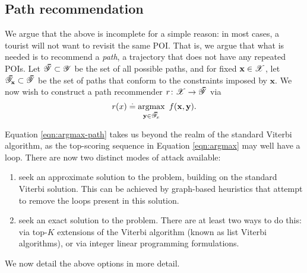 %
\subsection{Path recommendation}

We argue that the above is incomplete for a simple reason:
in most cases, a tourist will not want to revisit the same POI.
That is, we argue that what is needed is to recommend a \emph{path}, \ie a trajectory that does not have any repeated POIs.
Let $\thickbar{\YCal} \subset \YCal$ be the set of all possible paths,
and for fixed $\mathbf{x} \in \mathscr{X}$, let $\thickbar{\YCal}_{\x} \subset \thickbar{\YCal}$ be the set of paths that conform to the constraints imposed by $\mathbf{x}$.
We now wish to construct a path recommender $r \colon \XCal \to \thickbar{\YCal}$ via
\begin{equation}
	\label{eqn:argmax-path}
	r( x ) \defEq \argmax_{\mathbf{y} \in \thickbar{\YCal}_x}~f(\mathbf{x}, \mathbf{y}).
\end{equation}

Equation \ref{eqn:argmax-path} takes us beyond the realm of the standard Viterbi algorithm, as the top-scoring sequence in Equation \ref{eqn:argmax} may well have a loop.
There are now two distinct modes of attack available:
\begin{enumerate}
	\item seek an approximate solution to the problem, building on the standard Viterbi solution.
	This can be achieved by graph-based heuristics that attempt to remove the loops present in this solution.

	\item seek an exact solution to the problem.
	There are at least two ways to do this:
	via top-$K$ extensions of the Viterbi algorithm (known as list Viterbi algorithms),
	or via integer linear programming formulations.
\end{enumerate}

We now detail the above options in more detail.



